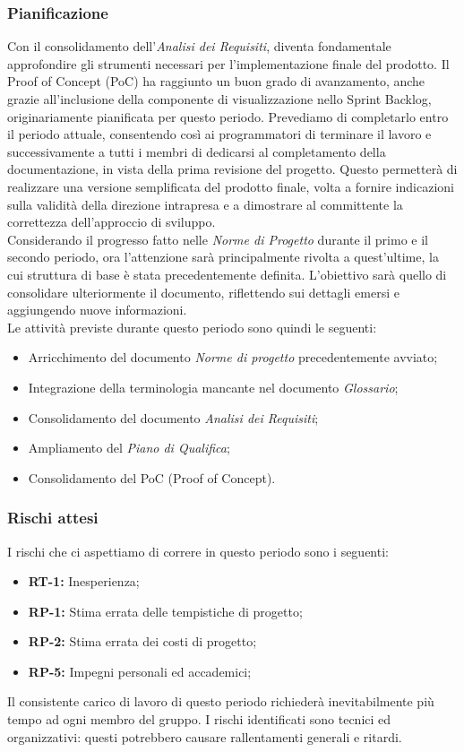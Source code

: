 \subsubsection{Pianificazione}
Con il consolidamento dell'\textit{Analisi dei Requisiti}, diventa fondamentale approfondire gli
strumenti necessari per l'implementazione finale del prodotto. Il Proof of Concept (PoC) ha
raggiunto un buon grado di avanzamento, anche grazie all'inclusione della componente di
visualizzazione nello Sprint Backlog, originariamente pianificata per questo periodo.
Prevediamo di completarlo entro il periodo attuale, consentendo così ai programmatori di terminare
il lavoro e successivamente a tutti i membri di dedicarsi al completamento della documentazione, in
vista della prima revisione del progetto. Questo permetterà di realizzare una versione semplificata
del prodotto finale, volta a fornire indicazioni sulla validità della direzione intrapresa e a
dimostrare al committente la correttezza dell'approccio di sviluppo.\\
Considerando il progresso fatto nelle \textit{Norme di Progetto} durante il primo e il secondo
periodo, ora l'attenzione sarà principalmente rivolta a quest'ultime, la cui struttura di base è
stata precedentemente definita. L'obiettivo sarà quello di consolidare ulteriormente il documento,
riflettendo sui dettagli emersi e aggiungendo nuove informazioni.\\
Le attivit\`{a} previste durante questo periodo sono quindi le seguenti:
\begin{itemize}
\setlength{\itemsep}{0}
    \item Arricchimento del documento \textit{Norme di progetto} precedentemente avviato;
    \item Integrazione della terminologia mancante nel documento \textit{Glossario};
    \item Consolidamento del documento \textit{Analisi dei Requisiti};
    \item Ampliamento del \textit{Piano di Qualifica};
    \item Consolidamento del PoC (Proof of Concept).
\end{itemize}
\subsubsection{Rischi attesi}
I rischi che ci aspettiamo di correre in questo periodo sono i seguenti: 
\begin{itemize}
\setlength{\itemsep}{0}
\item \textbf{RT-1:} Inesperienza;
\item \textbf{RP-1:} Stima errata delle tempistiche di progetto;
\item \textbf{RP-2:} Stima errata dei costi di progetto;
\item \textbf{RP-5:} Impegni personali ed accademici;
\end{itemize}
Il consistente carico di lavoro di questo periodo richiederà inevitabilmente più tempo ad ogni membro del gruppo. I rischi identificati sono tecnici ed organizzativi: questi potrebbero causare rallentamenti generali e ritardi.
\clearpage
